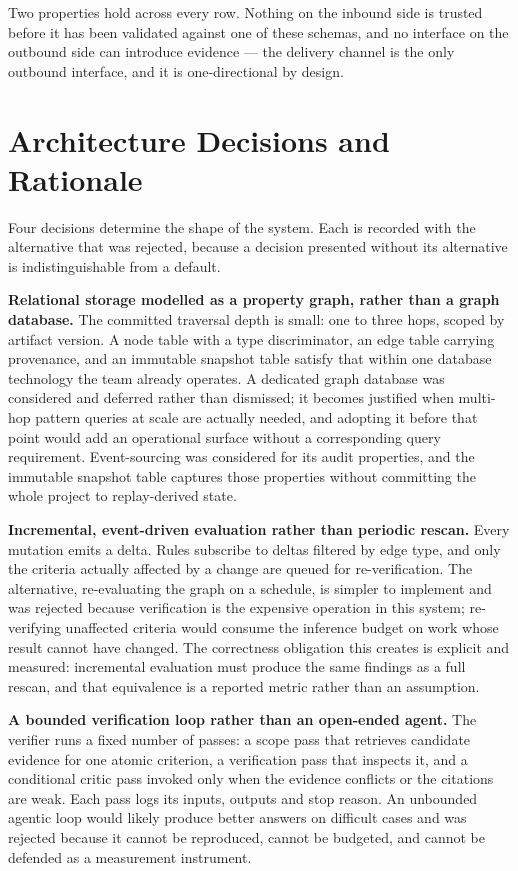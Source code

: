 \noindent Two properties hold across every row. Nothing on the inbound side is
trusted before it has been validated against one of these schemas, and no
interface on the outbound side can introduce evidence --- the delivery channel
is the only outbound interface, and it is one-directional by design.

\section{Architecture Decisions and Rationale}

Four decisions determine the shape of the system. Each is recorded with the
alternative that was rejected, because a decision presented without its
alternative is indistinguishable from a default.

\textbf{Relational storage modelled as a property graph, rather than a graph
database.} The committed traversal depth is small: one to three hops, scoped by
artifact version. A node table with a type discriminator, an edge table carrying
provenance, and an immutable snapshot table satisfy that within one database
technology the team already operates. A dedicated graph database was considered
and deferred rather than dismissed; it becomes justified when multi-hop pattern
queries at scale are actually needed, and adopting it before that point would
add an operational surface without a corresponding query requirement.
Event-sourcing was considered for its audit properties, and the immutable
snapshot table captures those properties without committing the whole project to
replay-derived state.

\textbf{Incremental, event-driven evaluation rather than periodic rescan.} Every
mutation emits a delta. Rules subscribe to deltas filtered by edge type, and
only the criteria actually affected by a change are queued for re-verification.
The alternative, re-evaluating the graph on a schedule, is simpler to implement
and was rejected because verification is the expensive operation in this system;
re-verifying unaffected criteria would consume the inference budget on work
whose result cannot have changed. The correctness obligation this creates is
explicit and measured: incremental evaluation must produce the same findings as
a full rescan, and that equivalence is a reported metric rather than an
assumption.

\textbf{A bounded verification loop rather than an open-ended agent.} The
verifier runs a fixed number of passes: a scope pass that retrieves candidate
evidence for one atomic criterion, a verification pass that inspects it, and a
conditional critic pass invoked only when the evidence conflicts or the citations
are weak. Each pass logs its inputs, outputs and stop reason. An unbounded
agentic loop would likely produce better answers on difficult cases and was
rejected because it cannot be reproduced, cannot be budgeted, and cannot be
defended as a measurement instrument.

